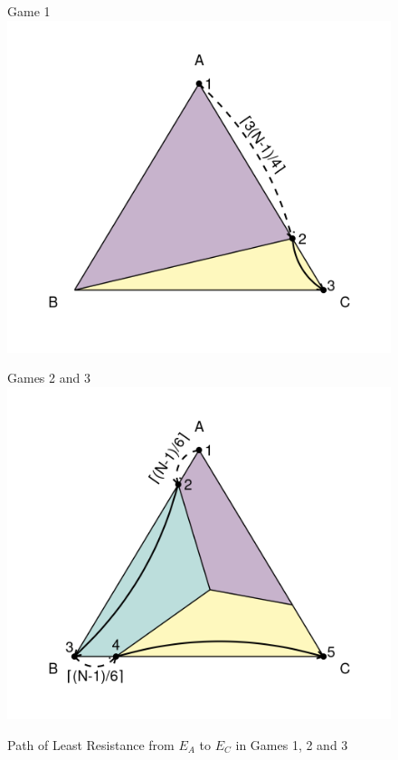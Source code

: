 \begin{figure}[h]
\captionsetup{justification=centering}
  \caption[caption]{Path of Least Resistance from $E_A$ to $E_C$ in Games 1, 2 and 3}
   \label{fig:ResistancePlotsTheory}

\vskip12pt
\begin{minipage}[c]{.49\textwidth}
\centering
Game 1 
\vskip6pt
\includegraphics[width = \textwidth]{Images/Resistance1.6.png}
\end{minipage}
\begin{minipage}[c]{.49\textwidth}
\centering
Games 2 and 3 
\vskip6pt
\includegraphics[width = \textwidth]{Images/Resistance23.6.png}

\end{minipage}
\end{figure}
